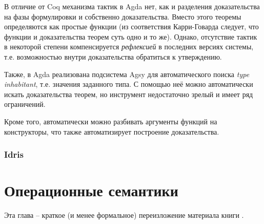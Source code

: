 \documentclass[aps,12pt,final,oneside,onecolumn,musixtex,superscriptaddress,centertags]{article}
\begin{document}
     В отличие от Coq механизма тактик в Agda нет, как и разделения доказательства на фазы формулировки и собственно доказательства. Вместо этого теоремы определяются как простые функции (из соответствия Карри-Говарда следует, что функции и доказательства теорем суть одно и то же). Однако, отсутствие тактик в некоторой степени компенсируется \emph{рефлексией} в последних версиях системы, т.е. возможностью внутри доказательства обратиться к утверждению.

     Также, в Agda реализована подсистема Agsy для автоматического поиска \emph{type inhabitant}, т.е. значения заданного типа. С помощью неё можно автоматически искать доказательства теорем, но инструмент недостаточно зрелый и имеет ряд ограничений.

     Кроме того, автоматически можно разбивать аргументы функций на конструкторы, что также автоматизирует построение доказательства.

  \subsubsection{Idris}

  \newpage

  \section{Операционные семантики}

    \newcommand{\control}[2]{\langle #1, #2 \rangle}
    \newcommand{\rulens}[3]{\control{#1}{#2} \to #3}
    \newcommand{\ruless}[4]{\rulens{#1}{#2}{#3} \frac{#4}{}}
    \newcommand{\tree}[3]{\cfrac{#1 \hspace{10mm} #2}{#3}}

    \newcommand{\seqns}[0]{\tree{\rulens{p_1}{s_0}{s_1}}{\rulens{p_2}{s_1}{s_2}}{\rulens{p_1 ; p_2}{s_0}{s_2}}}
    \newcommand{\iftruens}[0]{s_0[b] = true\Rightarrow\tree{\rulens{p_1}{s_0}{s_1}}{}
                                                           {\rulens{\mbox{if b then $p_1$ else $p_2$}}{s_0}{s_1}}}
    \newcommand{\assignns}[0]{\rulens{x:=a}{s}{s[x \mapsto a]}}

    \newcommand{\seqssn}[0]{\tree{\rulens{p_1}{s_0}{s_1}}{}{\ruless{p_1 ; p_2}{s_0}{s_1}{p_2}}}
    \newcommand{\seqssj}[0]{\tree{\ruless{p_1}{s_0}{s_1}{p_1'}}{}
                                 {\ruless{p_1 ; p_2}{s_0}{s_1}{p_1' ; p_2}}}
    \newcommand{\iftruess}[0]{s[b] = true\Rightarrow\ruless{\mbox{if b then $p_1$ else $p_2$}}{s}{s}{p_1}}

    Эта глава -- краткое (и менее формальное) переизложение материала книги \cite{Nielson:1992:SAF:129085}.
\end{document}
